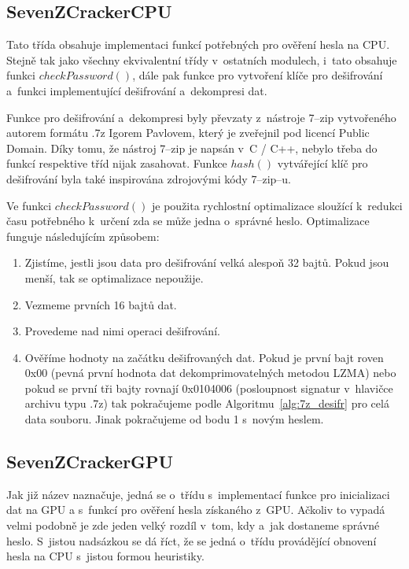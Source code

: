 \subsection{SevenZCrackerCPU}
\label{ssec:7zcrackercpu}
Tato třída obsahuje implementaci funkcí potřebných pro ověření hesla na CPU. Stejně tak jako
všechny ekvivalentní třídy v~ostatních modulech, i~tato obsahuje funkci
\linebreak $checkPassword()$, dále pak
funkce pro vytvoření klíče pro dešifrování a~funkci implementující dešifrování a~dekompresi dat.

 Funkce pro dešifrování a~dekompresi byly převzaty z~nástroje 7--zip vytvořeného autorem formátu .7z
Igorem Pavlovem, který je zveřejnil pod licencí Public Domain. Díky tomu, že nástroj 7--zip je
napsán v~C / C++, nebylo třeba do funkcí respektive tříd nijak zasahovat. Funkce $hash()$
vytvářející klíč pro dešifrování byla také inspirována zdrojovými kódy 7--zip--u. 

 Ve funkci $checkPassword()$ je použita rychlostní optimalizace sloužící k~redukci času
potřebného k~určení zda se může jedna o~správné heslo. Optimalizace funguje následujícím způsobem:
\begin{enumerate}
    \item Zjistíme, jestli jsou data pro dešifrování velká alespoň 32 bajtů. Pokud jsou menší, tak
	se optimalizace nepoužije.
    \item Vezmeme prvních 16 bajtů dat.
    \item Provedeme nad nimi operaci dešifrování.
    \item Ověříme hodnoty na začátku dešifrovaných dat. Pokud je první bajt roven 0x00
	(pevná první hodnota dat dekomprimovatelných metodou LZMA) nebo pokud se první tři bajty rovnají
	0x0104006 (posloupnost signatur v~hlavičce archivu typu .7z) tak pokračujeme podle
	Algoritmu~\ref{alg:7z_desifr} pro celá data souboru. Jinak pokračujeme od bodu 1 s~novým heslem.
\end{enumerate}
\subsection{SevenZCrackerGPU}
Jak již název naznačuje, jedná se o~třídu s~implementací funkce pro inicializaci dat na GPU a
s~funkcí pro ověření hesla získaného z~GPU. Ačkoliv to vypadá velmi podobně je zde jeden velký
rozdíl v~tom, kdy a~jak dostaneme správné heslo. S~jistou nadsázkou se dá říct, že se jedná
o~třídu provádějící obnovení hesla na CPU s~jistou formou heuristiky. 

